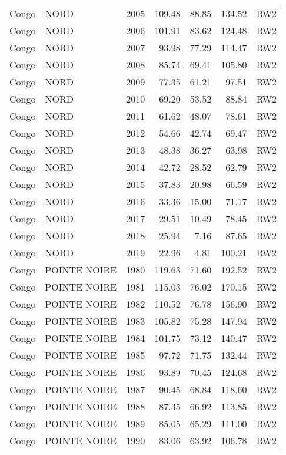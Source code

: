 \begin{longtable}{lllrrrl}
  Congo & NORD & 2005 & 109.48 & 88.85 & 134.52 & RW2 \\ 
  Congo & NORD & 2006 & 101.91 & 83.62 & 124.48 & RW2 \\ 
  Congo & NORD & 2007 & 93.98 & 77.29 & 114.47 & RW2 \\ 
  Congo & NORD & 2008 & 85.74 & 69.41 & 105.80 & RW2 \\ 
  Congo & NORD & 2009 & 77.35 & 61.21 & 97.51 & RW2 \\ 
  Congo & NORD & 2010 & 69.20 & 53.52 & 88.84 & RW2 \\ 
  Congo & NORD & 2011 & 61.62 & 48.07 & 78.61 & RW2 \\ 
  Congo & NORD & 2012 & 54.66 & 42.74 & 69.47 & RW2 \\ 
  Congo & NORD & 2013 & 48.38 & 36.27 & 63.98 & RW2 \\ 
  Congo & NORD & 2014 & 42.72 & 28.52 & 62.79 & RW2 \\ 
  Congo & NORD & 2015 & 37.83 & 20.98 & 66.59 & RW2 \\ 
  Congo & NORD & 2016 & 33.36 & 15.00 & 71.17 & RW2 \\ 
  Congo & NORD & 2017 & 29.51 & 10.49 & 78.45 & RW2 \\ 
  Congo & NORD & 2018 & 25.94 & 7.16 & 87.65 & RW2 \\ 
  Congo & NORD & 2019 & 22.96 & 4.81 & 100.21 & RW2 \\ 
  Congo & POINTE NOIRE & 1980 & 119.63 & 71.60 & 192.52 & RW2 \\ 
  Congo & POINTE NOIRE & 1981 & 115.03 & 76.02 & 170.15 & RW2 \\ 
  Congo & POINTE NOIRE & 1982 & 110.52 & 76.78 & 156.90 & RW2 \\ 
  Congo & POINTE NOIRE & 1983 & 105.82 & 75.28 & 147.94 & RW2 \\ 
  Congo & POINTE NOIRE & 1984 & 101.75 & 73.12 & 140.47 & RW2 \\ 
  Congo & POINTE NOIRE & 1985 & 97.72 & 71.75 & 132.44 & RW2 \\ 
  Congo & POINTE NOIRE & 1986 & 93.89 & 70.45 & 124.68 & RW2 \\ 
  Congo & POINTE NOIRE & 1987 & 90.45 & 68.84 & 118.60 & RW2 \\ 
  Congo & POINTE NOIRE & 1988 & 87.35 & 66.92 & 113.85 & RW2 \\ 
  Congo & POINTE NOIRE & 1989 & 85.05 & 65.29 & 111.00 & RW2 \\ 
  Congo & POINTE NOIRE & 1990 & 83.06 & 63.92 & 106.78 & RW2 \\ 

\end{longtable}
